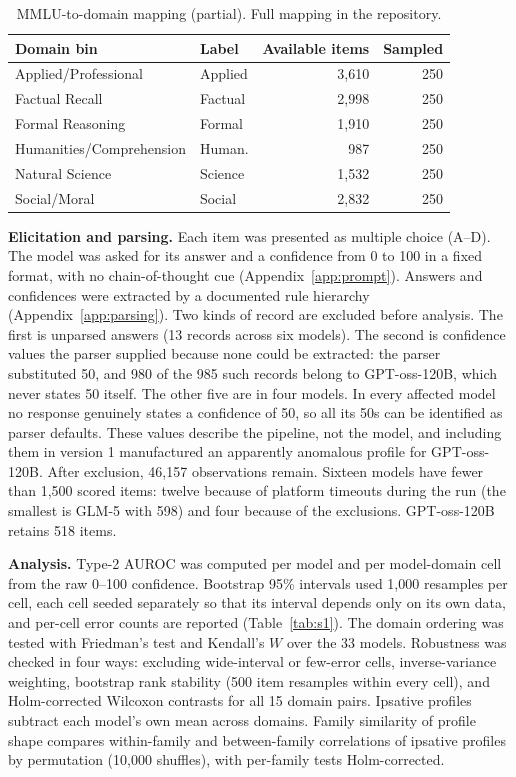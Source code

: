 \begin{table}[!htbp]
\centering
\caption{MMLU-to-domain mapping (partial). Full mapping in the repository.}
\label{tab:domains}
\small
\begin{tabular}{llrr}
\toprule
\textbf{Domain bin} & \textbf{Label} & \textbf{Available items} & \textbf{Sampled} \\
\midrule
Applied/Professional & Applied & 3{,}610 & 250 \\
Factual Recall & Factual & 2{,}998 & 250 \\
Formal Reasoning & Formal & 1{,}910 & 250 \\
Humanities/Comprehension & Human. & 987 & 250 \\
Natural Science & Science & 1{,}532 & 250 \\
Social/Moral & Social & 2{,}832 & 250 \\
\bottomrule
\end{tabular}
\end{table}

\textbf{Elicitation and parsing.} Each item was presented as multiple choice (A--D). The model was asked for its answer and a confidence from 0 to 100 in a fixed format, with no chain-of-thought cue (Appendix~\ref{app:prompt}). Answers and confidences were extracted by a documented rule hierarchy (Appendix~\ref{app:parsing}). Two kinds of record are excluded before analysis. The first is unparsed answers (13 records across six models). The second is confidence values the parser supplied because none could be extracted: the parser substituted 50, and 980 of the 985 such records belong to GPT-oss-120B, which never states 50 itself. The other five are in four models. In every affected model no response genuinely states a confidence of 50, so all its 50s can be identified as parser defaults. These values describe the pipeline, not the model, and including them in version 1 manufactured an apparently anomalous profile for GPT-oss-120B. After exclusion, 46{,}157 observations remain. Sixteen models have fewer than 1{,}500 scored items: twelve because of platform timeouts during the run (the smallest is GLM-5 with 598) and four because of the exclusions. GPT-oss-120B retains 518 items.

\textbf{Analysis.} Type-2 AUROC was computed per model and per model-domain cell from the raw 0--100 confidence. Bootstrap 95\% intervals used 1{,}000 resamples per cell, each cell seeded separately so that its interval depends only on its own data, and per-cell error counts are reported (Table~\ref{tab:s1}). The domain ordering was tested with Friedman's test and Kendall's $W$ over the 33 models. Robustness was checked in four ways: excluding wide-interval or few-error cells, inverse-variance weighting, bootstrap rank stability (500 item resamples within every cell), and Holm-corrected Wilcoxon contrasts for all 15 domain pairs. Ipsative profiles subtract each model's own mean across domains. Family similarity of profile shape compares within-family and between-family correlations of ipsative profiles by permutation (10{,}000 shuffles), with per-family tests Holm-corrected.

